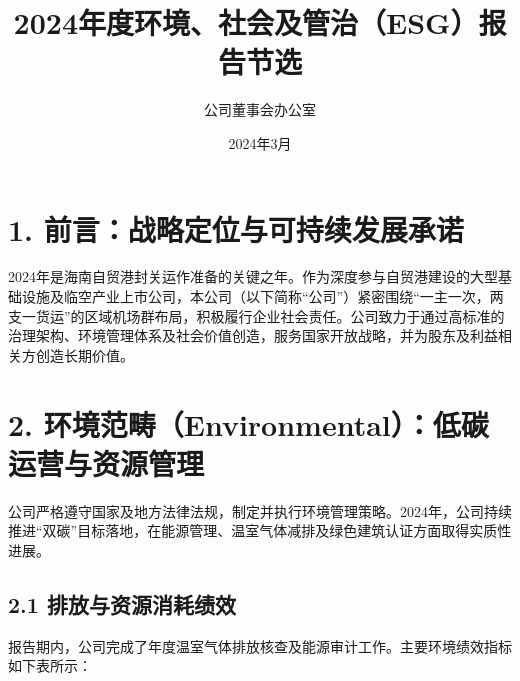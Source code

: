 \documentclass[a4paper,12pt]{article}
\title{\textbf{2024年度环境、社会及管治（ESG）报告节选}}
\author{公司董事会办公室}
\date{2024年3月}
\begin{document}
\maketitle

\section{1. 前言：战略定位与可持续发展承诺}

2024年是海南自贸港封关运作准备的关键之年。作为深度参与自贸港建设的大型基础设施及临空产业上市公司，本公司（以下简称“公司”）紧密围绕“一主一次，两支一货运”的区域机场群布局，积极履行企业社会责任。公司致力于通过高标准的治理架构、环境管理体系及社会价值创造，服务国家开放战略，并为股东及利益相关方创造长期价值。

\section{2. 环境范畴（Environmental）：低碳运营与资源管理}

公司严格遵守国家及地方法律法规，制定并执行环境管理策略。2024年，公司持续推进“双碳”目标落地，在能源管理、温室气体减排及绿色建筑认证方面取得实质性进展。

\subsection{2.1 排放与资源消耗绩效}

报告期内，公司完成了年度温室气体排放核查及能源审计工作。主要环境绩效指标如下表所示：
\end{document}
